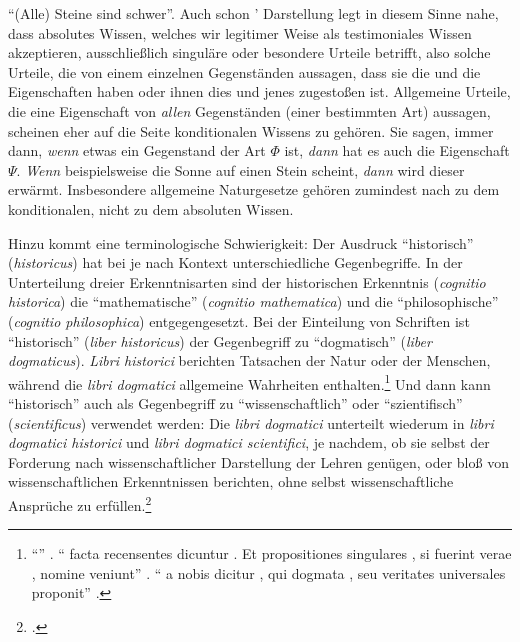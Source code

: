 \enquote{(Alle) Steine sind schwer}. Auch schon
' Darstellung legt in diesem Sinne nahe,
dass absolutes Wissen, welches wir legitimer Weise als testimoniales Wissen
akzeptieren, ausschließlich singuläre oder besondere Urteile betrifft, also
solche Urteile, die von einem einzelnen Gegenständen aussagen, dass sie die und
die Eigenschaften haben oder ihnen dies und jenes zugestoßen ist. Allgemeine
Urteile, die eine Eigenschaft von \emph{allen} Gegenständen (einer bestimmten
Art) aussagen, scheinen eher auf die Seite konditionalen Wissens zu gehören. Sie sagen, immer
dann, \emph{wenn} etwas ein Gegenstand der Art $\Phi $ ist, \emph{dann} hat es
auch die Eigenschaft $\Psi $. \emph{Wenn} beispielsweise die Sonne auf einen
Stein scheint, \emph{dann} wird dieser erwärmt. Insbesondere allgemeine Naturgesetze gehören
zumindest nach  zu dem konditionalen, nicht zu dem absoluten
Wissen.

Hinzu kommt eine terminologische Schwierigkeit: Der Ausdruck
\enquote{historisch} (\emph{historicus}) hat bei  je nach Kontext unterschiedliche
Gegenbegriffe. In der Unterteilung dreier Erkenntnisarten sind der historischen
Erkenntnis (\emph{cognitio historica}) die \enquote{mathematische}
(\emph{cognitio mathematica}) und die \enquote{philosophische} (\emph{cognitio
philosophica}) entgegengesetzt. Bei der Einteilung von Schriften ist
\enquote{historisch} (\emph{liber historicus}) der Gegenbegriff zu
\enquote{dogmatisch} (\emph{liber dogmaticus}).
\emph{Libri historici} berichten Tatsachen der Natur
oder der Menschen, während die \emph{libri dogmatici}
allgemeine Wahrheiten enthalten.\footnote{\enquote{}
\parencite[][\S~743]{Wolff:PhilosophiarationalissiveLogica1740}.
  \enquote{ facta recensentes dicuntur . Et
  propositiones singulares , si fuerint verae , 
  nomine veniunt}
  \parencite[][\S~744]{Wolff:PhilosophiarationalissiveLogica1740}.
  \enquote{ a nobis dicitur , qui dogmata , seu veritates
  universales proponit}
  \parencite[][\S~750]{Wolff:PhilosophiarationalissiveLogica1740}.} Und dann
  kann \enquote{historisch} auch als Gegenbegriff zu \enquote{wissenschaftlich}
  oder \enquote{szientifisch} (\emph{scientificus}) verwendet werden: Die
  \emph{libri dogmatici} unterteilt
 wiederum in \emph{libri dogmatici
historici} und \emph{libri dogmatici scientifici}, je nachdem, ob sie selbst der
Forderung nach wissenschaftlicher Darstellung der Lehren genügen, oder bloß
von wissenschaftlichen Erkenntnissen berichten, ohne selbst wissenschaftliche Ansprüche zu
erfüllen.\footnote{\cite[Vgl.][\S~751]{Wolff:PhilosophiarationalissiveLogica1740}.}




